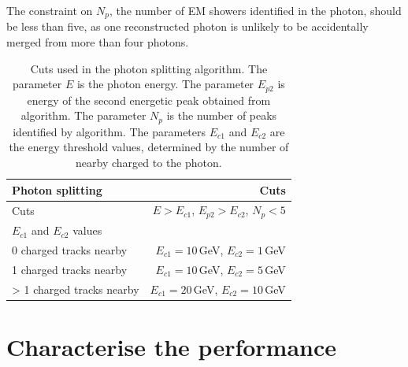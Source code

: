 
The constraint on $N_{p}$, the number of EM showers identified in the photon, should be less than five, as one reconstructed photon is unlikely to be accidentally merged from more than four photons.


\begin{table}[htbp]
\centering
\smallskip
\begin{tabular}{l r }
\hline
\hline
Photon splitting&  Cuts\\
\hline
\multicolumn{1}{L{0.3\textwidth}}{Cuts} & \multicolumn{1}{R{0.6\textwidth}}{$E > E_{c1}$, $E_{p2} > E_{c2}$, $N_{p} < 5$} \\
\hline
$E_{c1}$ and $E_{c2}$ values &  \\
\hline
\multicolumn{1}{L{0.3\textwidth}}{0 charged tracks nearby} & \multicolumn{1}{R{0.6\textwidth}}{$E_{c1} = 10$\,GeV, $E_{c2} = 1$\,GeV} \\
\multicolumn{1}{L{0.3\textwidth}}{1 charged tracks nearby} & \multicolumn{1}{R{0.6\textwidth}}{$E_{c1} = 10$\,GeV, $E_{c2} = 5$\,GeV} \\
\multicolumn{1}{L{0.3\textwidth}}{> 1 charged tracks nearby} & \multicolumn{1}{R{0.6\textwidth}}{$E_{c1} = 20$\,GeV, $E_{c2} = 10$\,GeV} \\
\hline
\hline
\end{tabular}

\caption[Cuts for splitting photons.]%
{Cuts used in the photon splitting algorithm. The parameter $E$ is the photon energy. The parameter $E_{p2}$ is  energy of the second energetic peak obtained from \peakFinding algorithm. The parameter $N_{p}$ is the number of peaks identified by \peakFinding algorithm. The parameters $E_{c1}$ and $E_{c2}$ are the energy threshold values, determined by the number of nearby charged  to the photon.}
\label{tab:photonPhotonSplitting}
\end{table}

\section{Characterise the performance}




